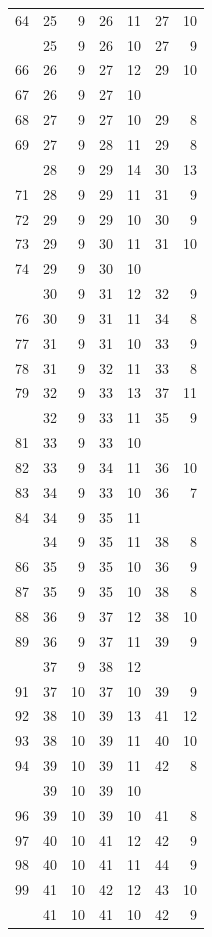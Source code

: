 \begin{Schunk}
\begin{longtable}{rrrrrrr}
64 & 25 & 9 & 26 & 11 & 27 & 10\\
\addlinespace
65 & 25 & 9 & 26 & 10 & 27 & 9\\
66 & 26 & 9 & 27 & 12 & 29 & 10\\
67 & 26 & 9 & 27 & 10 &  & \\
68 & 27 & 9 & 27 & 10 & 29 & 8\\
69 & 27 & 9 & 28 & 11 & 29 & 8\\
\addlinespace
70 & 28 & 9 & 29 & 14 & 30 & 13\\
71 & 28 & 9 & 29 & 11 & 31 & 9\\
72 & 29 & 9 & 29 & 10 & 30 & 9\\
73 & 29 & 9 & 30 & 11 & 31 & 10\\
74 & 29 & 9 & 30 & 10 &  & \\
\addlinespace
75 & 30 & 9 & 31 & 12 & 32 & 9\\
76 & 30 & 9 & 31 & 11 & 34 & 8\\
77 & 31 & 9 & 31 & 10 & 33 & 9\\
78 & 31 & 9 & 32 & 11 & 33 & 8\\
79 & 32 & 9 & 33 & 13 & 37 & 11\\
\addlinespace
80 & 32 & 9 & 33 & 11 & 35 & 9\\
81 & 33 & 9 & 33 & 10 &  & \\
82 & 33 & 9 & 34 & 11 & 36 & 10\\
83 & 34 & 9 & 33 & 10 & 36 & 7\\
84 & 34 & 9 & 35 & 11 &  & \\
\addlinespace
85 & 34 & 9 & 35 & 11 & 38 & 8\\
86 & 35 & 9 & 35 & 10 & 36 & 9\\
87 & 35 & 9 & 35 & 10 & 38 & 8\\
88 & 36 & 9 & 37 & 12 & 38 & 10\\
89 & 36 & 9 & 37 & 11 & 39 & 9\\
\addlinespace
90 & 37 & 9 & 38 & 12 &  & \\
91 & 37 & 10 & 37 & 10 & 39 & 9\\
92 & 38 & 10 & 39 & 13 & 41 & 12\\
93 & 38 & 10 & 39 & 11 & 40 & 10\\
94 & 39 & 10 & 39 & 11 & 42 & 8\\
\addlinespace
95 & 39 & 10 & 39 & 10 &  & \\
96 & 39 & 10 & 39 & 10 & 41 & 8\\
97 & 40 & 10 & 41 & 12 & 42 & 9\\
98 & 40 & 10 & 41 & 11 & 44 & 9\\
99 & 41 & 10 & 42 & 12 & 43 & 10\\
\addlinespace
100 & 41 & 10 & 41 & 10 & 42 & 9\\*
\end{longtable}

\end{Schunk}


